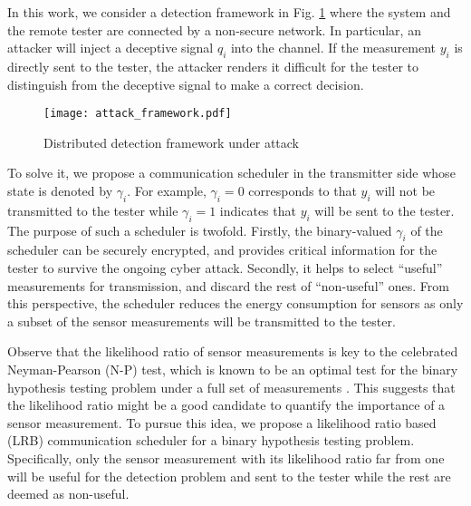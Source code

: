 \documentclass[journal]{IEEEtran}
\begin{document}
In this work,  we consider a detection framework in Fig. \ref{fig1} where the system and the remote tester are connected by a non-secure network. In particular, an attacker will inject a deceptive signal $q_i$ into the channel.  If the measurement $y_i$ is directly sent to the tester, the attacker renders it difficult for the tester to distinguish from the deceptive signal to make a correct decision.
\begin{figure}
  \centering
  \texttt{[image: attack\_framework.pdf]}
    \caption{ Distributed detection framework under attack}
  \label{fig1}
\end{figure}
To solve it, we propose a communication scheduler in the transmitter side whose state is denoted by $\gamma_{i}$. For example, $\gamma_{i}=0$ corresponds to that $y_{i}$ will not be transmitted to the tester while $\gamma_{i}=1$ indicates that $y_{i}$  will be sent to the tester.  The purpose of such a scheduler is twofold. Firstly, the binary-valued $\gamma_i$ of the scheduler can be securely encrypted, and provides critical information for the tester to survive the ongoing cyber attack. Secondly,  it helps to select ``useful'' measurements for transmission, and discard the rest of ``non-useful'' ones. From this perspective, the scheduler reduces the energy consumption for sensors as only a subset of the sensor measurements will be transmitted to the tester.





Observe that the likelihood ratio of sensor measurements is key to the celebrated Neyman-Pearson (N-P) test, which is known to be an optimal test for the binary hypothesis testing problem under a full set of measurements \cite{casella2001statistical}. This suggests that the likelihood ratio might be a good candidate to quantify the importance of a sensor measurement. To pursue this idea, we propose a  likelihood ratio based (LRB) communication scheduler for a binary hypothesis testing problem. Specifically, only the sensor measurement with its likelihood ratio far from one will be useful for the detection problem and sent to the tester while the rest are deemed as non-useful.
\end{document}
